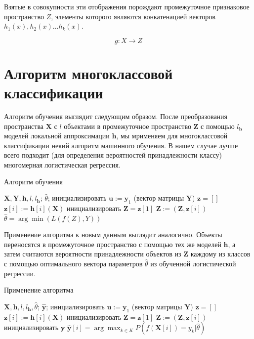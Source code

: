 \documentclass[12pt, fleqn, unicode]{article}
\newcommand{\bz}{\mathbf{z}}
\newcommand{\by}{\mathbf{y}}
\newcommand{\bY}{\mathbf{Y}}
\newcommand{\bX}{\mathbf{X}}
\newcommand{\bu}{\mathbf{u}}
\newcommand{\bh}{\mathbf{h}}
\newcommand{\bZ}{\mathbf{Z}}
\begin{document}
Взятые в совокупности эти отображения порождают промежуточное признаковое пространство
$Z$, элементы которого являются конкатенацией векторов $h_1(x), h_2(x)\ldots h_k(x)$.

$$
g: X \to Z
$$

\newpage
\section{Алгоритм многоклассовой классификации}

Алгоритм обучения выглядит следующим образом. После преобразования пространства
$\bX$ с $l$ объектами в промежуточное пространство $\bZ$ с помощью
$l_\bh$ моделей локальной аппроксимации $\bh$, мы мрименяем
для многоклассовой классификации некий алгоритм машинного обучения.
В нашем случае лучше всего подходит (для определения вероятностей принадлежности
классу) многомерная логистическая регрессия.

\begin{center}
\begin{algorithm}[h]
\caption{Алгоритм обучения}
    \label{learn}
\begin{algorithmic}[1]
\REQUIRE $\bX, \bY, \bh, l, l_\bh$;
\ENSURE $\hat{\theta}$;
\STATE инициализировать $\bu := \by_1$ (вектор матрицы $\bY$)
\STATE $\bz = []$
\FOR{$i=1,\dots, l_\bh$}
    $\bz[i] := \bh[i](\bX)$
\ENDFOR
\STATE инициализировать $\bZ = \bz[1]$
\FOR{$i=2,\dots, l_\bh$}
    $\bZ  := (\bZ, \bz[i])$
\ENDFOR
\STATE $\hat{\theta} = \arg\min(L(f(Z), Y))$
\end{algorithmic}
\end{algorithm}
\end{center}

Применение алгоритма к новым данным выглядит аналогично. Объекты переносятся
в промежуточное пространство с помощью тех же моделей $\bh$, а затем
считаются вероятности принадлежности объектов из $\bZ$ каждому из классов
с помощью оптимального вектора параметров $\hat{\theta}$ из обученной
логистической регрессии.

\begin{center}
    \begin{algorithm}[h]
    \caption{Применение алгоритма}
        \label{apply}
    \begin{algorithmic}[1]
    \REQUIRE $\bX, \bh, l, l_\bh, \hat{\theta}$;
    \ENSURE $\hat{\by}$;
    \STATE инициализировать $\bu := \by_1$ (вектор матрицы $\bY$)
    \STATE $\bz = []$
    \FOR{$i=1,\dots, l_\bh$}
        \STATE $\bz[i] := \bh[i](\bX)$
    \ENDFOR
    \STATE инициализировать $\bZ = \bz[1]$
    \FOR{$i=2,\dots, l_\bh$}
        \STATE $\bZ  := (\bZ, \bz[i])$
    \ENDFOR
    \STATE инициализировать $\hat{\by}$
        \STATE $\hat{\by}[i] = \arg\max_{k \in K} P(f(\bX[i]) = y_k| \hat{\theta})$
    \ENDFOR
\end{algorithmic}
\end{algorithm}
\end{center}
\end{document}
